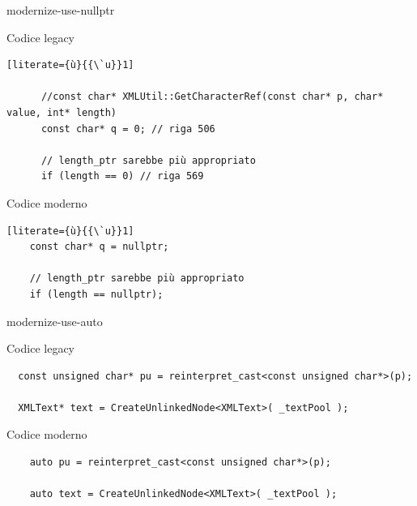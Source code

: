 \documentclass[aspectratio=169]{beamer}
\begin{document}
\begin{frame}[fragile]{modernize-use-nullptr}
  \begin{block}{Codice legacy}
  \begin{lstlisting}[literate={ù}{{\`u}}1]
      
      //const char* XMLUtil::GetCharacterRef(const char* p, char* value, int* length) 
      const char* q = 0; // riga 506
      
      // length_ptr sarebbe più appropriato
      if (length == 0) // riga 569
   \end{lstlisting}
 \end{block}

 \begin{block}{Codice moderno}
    \begin{lstlisting}[literate={ù}{{\`u}}1] 
    const char* q = nullptr;
    
    // length_ptr sarebbe più appropriato
    if (length == nullptr);

    \end{lstlisting}
  \end{block}

\end{frame}




\begin{frame}[fragile]{modernize-use-auto}
  \begin{block}{Codice legacy}
  \begin{lstlisting}
  const unsigned char* pu = reinterpret_cast<const unsigned char*>(p);

  XMLText* text = CreateUnlinkedNode<XMLText>( _textPool );
   \end{lstlisting}
 \end{block}

 \begin{block}{Codice moderno}
    \begin{lstlisting}
    auto pu = reinterpret_cast<const unsigned char*>(p);

    auto text = CreateUnlinkedNode<XMLText>( _textPool );
    \end{lstlisting}
  \end{block}

\end{frame}


\end{document}
